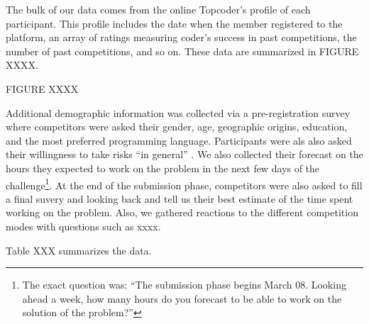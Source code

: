 \documentclass[12pt,]{article}
\theoremstyle{plain} %
\begin{document}
The bulk of our data comes from the online Topcoder's profile of each
participant. This profile includes the date when the member registered
to the platform, an array of ratings measuring coder's success in past
competitions, the number of past competitions, and so on. These data are
summarized in FIGURE XXXX.

FIGURE XXXX

Additional demographic information was collected via a pre-registration
survey where competitors were asked their gender, age, geographic
origins, education, and the most preferred programming language.
Participants were als also asked their willingness to take risks ``in
general'' \citep[as in][]{dohmen2011individual}. We also collected their
forecast on the hours they expected to work on the problem in the next
few days of the challenge\footnote{The exact question was: ``The
  submission phase begins March 08. Looking ahead a week, how many hours
  do you forecast to be able to work on the solution of the problem?''}.
At the end of the submission phase, competitors were also asked to fill
a final suvery and looking back and tell us their best estimate of the
time spent working on the problem. Also, we gathered reactions to the
different competition modes with questions such as xxxx.

Table XXX summarizes the data.
\end{document}
